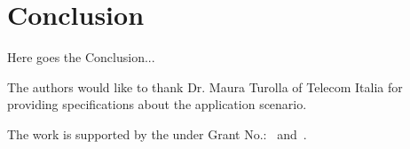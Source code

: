 \documentclass[format=acmsmall, review=true, screen=true, anonymous=false]{acmart}
\begin{document}











\section{Conclusion}\label{sec:conclusion}
Here goes the Conclusion...


\begin{acks}

The authors would like to thank Dr. Maura Turolla of Telecom
Italia for providing specifications about the application scenario.

The work is supported by the  under Grant
No.:~
and~.


\end{acks}



\end{document}
